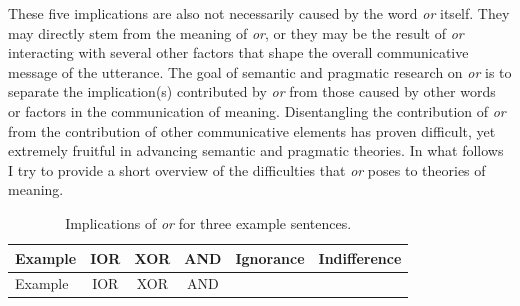 \documentclass[oneside]{report}
\theoremstyle{definition}
\theoremstyle{definition}
\theoremstyle{definition}
\theoremstyle{remark}
\begin{document}
These five implications are also not necessarily caused by the word
\emph{or} itself. They may directly stem from the meaning of \emph{or},
or they may be the result of \emph{or} interacting with several other
factors that shape the overall communicative message of the utterance.
The goal of semantic and pragmatic research on \emph{or} is to separate
the implication(s) contributed by \emph{or} from those caused by other
words or factors in the communication of meaning. Disentangling the
contribution of \emph{or} from the contribution of other communicative
elements has proven difficult, yet extremely fruitful in advancing
semantic and pragmatic theories. In what follows I try to provide a
short overview of the difficulties that \emph{or} poses to theories of
meaning.
\begin{longtable}[]{@{}lccccc@{}}
\caption{\label{tab:implications} Implications of \emph{or} for three
example sentences.}\tabularnewline
\toprule
\begin{minipage}[b]{0.45\columnwidth}\raggedright\strut
Example\strut
\end{minipage} & \begin{minipage}[b]{0.05\columnwidth}\centering\strut
IOR\strut
\end{minipage} & \begin{minipage}[b]{0.05\columnwidth}\centering\strut
XOR\strut
\end{minipage} & \begin{minipage}[b]{0.05\columnwidth}\centering\strut
AND\strut
\end{minipage} & \begin{minipage}[b]{0.12\columnwidth}\centering\strut
Ignorance\strut
\end{minipage} & \begin{minipage}[b]{0.12\columnwidth}\centering\strut
Indifference\strut
\end{minipage}\tabularnewline
\midrule
\endfirsthead
\toprule
\begin{minipage}[b]{0.45\columnwidth}\raggedright\strut
Example\strut
\end{minipage} & \begin{minipage}[b]{0.05\columnwidth}\centering\strut
IOR\strut
\end{minipage} & \begin{minipage}[b]{0.05\columnwidth}\centering\strut
XOR\strut
\end{minipage} & \begin{minipage}[b]{0.05\columnwidth}\centering\strut
AND\strut
\end{minipage} & \begin{minipage}[b]{0.12\columnwidth}\centering\strut

\end{minipage}
\end{longtable}
\end{document}
